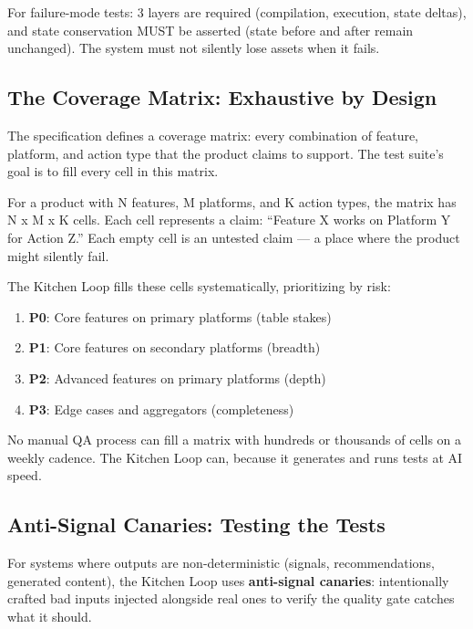 \documentclass[11pt,a4paper]{article}
\providecommand{\tightlist}{%
  \setlength{\itemsep}{0pt}\setlength{\parskip}{0pt}}
\begin{document}
For failure-mode tests: 3 layers are required (compilation, execution, state deltas), and state conservation MUST be asserted (state before and after remain unchanged). The system must not silently lose assets when it fails.

\subsection{The Coverage Matrix: Exhaustive by Design}\label{sec:coverage-matrix-exhaustive-by-design}

The specification defines a coverage matrix: every combination of feature, platform, and action type that the product claims to support. The test suite's goal is to fill every cell in this matrix.

For a product with N features, M platforms, and K action types, the matrix has N x M x K cells. Each cell represents a claim: ``Feature X works on Platform Y for Action Z.'' Each empty cell is an untested claim --- a place where the product might silently fail.

The Kitchen Loop fills these cells systematically, prioritizing by risk:

\begin{enumerate}
\def\labelenumi{\arabic{enumi}.}
\tightlist
\item
  \textbf{P0}: Core features on primary platforms (table stakes)
\item
  \textbf{P1}: Core features on secondary platforms (breadth)
\item
  \textbf{P2}: Advanced features on primary platforms (depth)
\item
  \textbf{P3}: Edge cases and aggregators (completeness)
\end{enumerate}

No manual QA process can fill a matrix with hundreds or thousands of cells on a weekly cadence. The Kitchen Loop can, because it generates and runs tests at AI speed.

\subsection{Anti-Signal Canaries: Testing the Tests}\label{sec:anti-signal-canaries-testing-the-tests}

For systems where outputs are non-deterministic (signals, recommendations, generated content), the Kitchen Loop uses \textbf{anti-signal canaries}: intentionally crafted bad inputs injected alongside real ones to verify the quality gate catches what it should.
\end{document}
